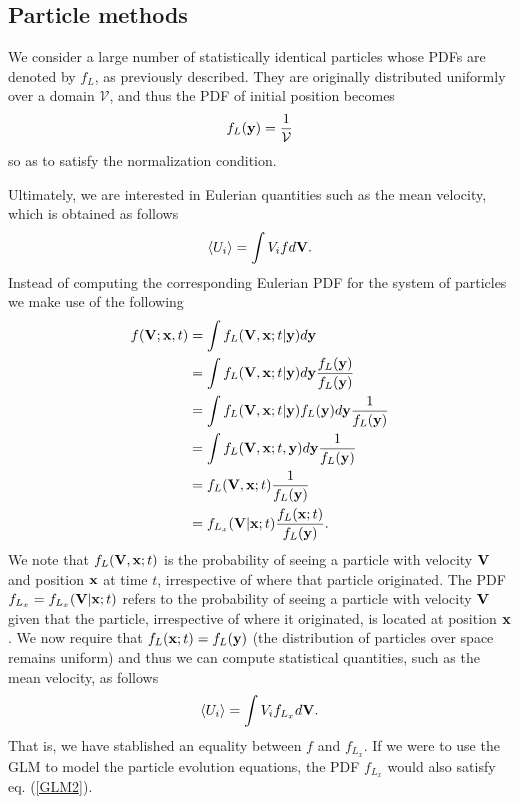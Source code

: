 \documentclass[oneside,a4paper,11pt]{report}
\begin{document}
\subsection{Particle methods}
We consider a large number of statistically identical particles whose PDFs are denoted by  $f_L$, as previously described. They are originally distributed uniformly over a domain $\mathcal{V}$, and thus the PDF of initial position becomes
\begin{equation}
f_L(\mathbf{y}) = \frac{1}{\mathcal{V}}
\end{equation}
so as to satisfy the normalization condition.

Ultimately, we are interested in Eulerian quantities such as the mean velocity, which is obtained as follows
\begin{equation}
\langle U_i \rangle = \int V_i f d\mathbf{V}.
\end{equation}
Instead of computing the corresponding Eulerian PDF for the system of particles we make use of the following
\begin{align}
f(\mathbf{V}; \mathbf{x},t) &= \int f_L(\mathbf{V}, \mathbf{x}; t|\mathbf{y}) d\mathbf{y} \nonumber \\
& = \int f_L(\mathbf{V}, \mathbf{x}; t|\mathbf{y}) d\mathbf{y} \frac{f_L(\mathbf{y})}{f_L(\mathbf{y})} \nonumber \\
& = \int f_L(\mathbf{V}, \mathbf{x}; t| \mathbf{y}) f_L(\mathbf{y}) d\mathbf{y} \frac{1}{f_L(\mathbf{y})} \nonumber \\
& = \int f_L(\mathbf{V}, \mathbf{x}; t, \mathbf{y}) d\mathbf{y} \frac{1}{f_L(\mathbf{y})} \nonumber \\
& = f_L(\mathbf{V}, \mathbf{x}; t) \frac{1}{f_L(\mathbf{y})} \nonumber \\
& = f_{L_x}(\mathbf{V}| \mathbf{x}; t) \frac{f_L(\mathbf{x}; t)}{f_L(\mathbf{y})}.
\end{align}
We note that $f_L(\mathbf{V},\mathbf{x};t)$ is the probability of seeing a particle with velocity $\mathbf{V}$ and position $\mathbf{x}$ at time $t$, irrespective of where that particle originated. The PDF $f_{L_x} = f_{L_x}(\mathbf{V}|\mathbf{x};t)$ refers to the probability of seeing a particle with velocity $\mathbf{V}$ given that the particle, irrespective of where it originated, is located at position $\mathbf{x}$. We now require that $f_L(\mathbf{x};t) = f_L(\mathbf{y})$ (the distribution of particles over space remains uniform) and thus we can compute statistical quantities, such as the mean velocity, as follows
\begin{equation}
\langle U_i \rangle = \int V_i f_{L_x} d\mathbf{V}.
\end{equation}
That is, we have stablished an equality between $f$ and $f_{L_x}$. If we were to use the GLM to model the particle evolution equations, the PDF $f_{L_x}$ would also satisfy eq. (\ref{GLM2}).
\end{document}
